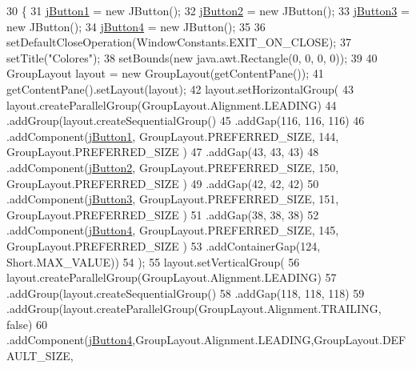 \begin{DoxyCode}
30                                   \{
31         \mbox{\hyperlink{class_ejercicio5_1_1_ventana_a702e08175eb5d9e0c166057793e3485f}{jButton1}} = \textcolor{keyword}{new} JButton();
32         \mbox{\hyperlink{class_ejercicio5_1_1_ventana_a88c68c1181c9c77989b5bc2dc1077e61}{jButton2}} = \textcolor{keyword}{new} JButton();
33         \mbox{\hyperlink{class_ejercicio5_1_1_ventana_ad6b3375b47f266259e624fe196b01145}{jButton3}} = \textcolor{keyword}{new} JButton();
34         \mbox{\hyperlink{class_ejercicio5_1_1_ventana_ab6ffbdcee4107a3c8b53abc7c160db05}{jButton4}} = \textcolor{keyword}{new} JButton();
35  
36         setDefaultCloseOperation(WindowConstants.EXIT\_ON\_CLOSE);
37         setTitle(\textcolor{stringliteral}{"Colores"});
38         setBounds(\textcolor{keyword}{new} java.awt.Rectangle(0, 0, 0, 0));
39  
40         GroupLayout layout = \textcolor{keyword}{new} GroupLayout(getContentPane());
41         getContentPane().setLayout(layout);
42         layout.setHorizontalGroup(
43             layout.createParallelGroup(GroupLayout.Alignment.LEADING)
44             .addGroup(layout.createSequentialGroup()
45                 .addGap(116, 116, 116)
46                 .addComponent(\mbox{\hyperlink{class_ejercicio5_1_1_ventana_a702e08175eb5d9e0c166057793e3485f}{jButton1}}, GroupLayout.PREFERRED\_SIZE, 144, GroupLayout.PREFERRED\_SIZE
      )
47                 .addGap(43, 43, 43)
48                 .addComponent(\mbox{\hyperlink{class_ejercicio5_1_1_ventana_a88c68c1181c9c77989b5bc2dc1077e61}{jButton2}}, GroupLayout.PREFERRED\_SIZE, 150, GroupLayout.PREFERRED\_SIZE
      )
49                 .addGap(42, 42, 42)
50                 .addComponent(\mbox{\hyperlink{class_ejercicio5_1_1_ventana_ad6b3375b47f266259e624fe196b01145}{jButton3}}, GroupLayout.PREFERRED\_SIZE, 151, GroupLayout.PREFERRED\_SIZE
      )
51                 .addGap(38, 38, 38)
52                 .addComponent(\mbox{\hyperlink{class_ejercicio5_1_1_ventana_ab6ffbdcee4107a3c8b53abc7c160db05}{jButton4}}, GroupLayout.PREFERRED\_SIZE, 145, GroupLayout.PREFERRED\_SIZE
      )
53                 .addContainerGap(124, Short.MAX\_VALUE))
54         );
55         layout.setVerticalGroup(
56             layout.createParallelGroup(GroupLayout.Alignment.LEADING)
57             .addGroup(layout.createSequentialGroup()
58                 .addGap(118, 118, 118)
59                 .addGroup(layout.createParallelGroup(GroupLayout.Alignment.TRAILING, \textcolor{keyword}{false})
60                    .addComponent(\mbox{\hyperlink{class_ejercicio5_1_1_ventana_ab6ffbdcee4107a3c8b53abc7c160db05}{jButton4}},GroupLayout.Alignment.LEADING,GroupLayout.DEFAULT\_SIZE, 

\end{DoxyCode}
